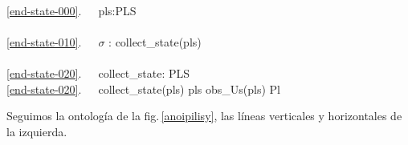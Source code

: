 \bp
{}\\
\ref{end-state-000}.\ \ \ pls:PLS\ \ \\
\\
\ref{end-state-010}.\ \ \ $\sigma$ :{\EQ} collect\_state(pls)\ \  \\
 \\
\ref{end-state-020}.\ \ \ collect\_state: PLS\ \ \ \\
\ref{end-state-020}.\ \ \ collect\_state(pls) {\IS} {\LBRACE}pls{\RBRACE}\,{\UNION}\,obs\_Us(pls) {\SETMINUS} Pl
\ep


\begynd
\pind Seguimos la ontología de la fig.\,\vref{anoipilisy}, \nyl las
líneas verticales y horizontales de la izquierda.
\afslut



